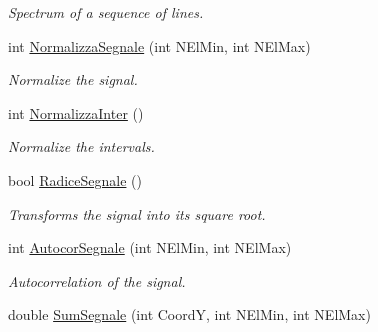 \begin{DoxyCompactItemize}
\begin{DoxyCompactList}\small\item\em \-Spectrum of a sequence of lines. \end{DoxyCompactList}\item 
\hypertarget{classVarDatFile_a0e495e387b74aaa6d55510a945236064}{int \hyperlink{classVarDatFile_a0e495e387b74aaa6d55510a945236064}{\-Normalizza\-Segnale} (int \-N\-El\-Min, int \-N\-El\-Max)}\label{classVarDatFile_a0e495e387b74aaa6d55510a945236064}

\begin{DoxyCompactList}\small\item\em \-Normalize the signal. \end{DoxyCompactList}\item 
\hypertarget{classVarDatFile_a2f01ea77260e98cb7edbb892988fd687}{int \hyperlink{classVarDatFile_a2f01ea77260e98cb7edbb892988fd687}{\-Normalizza\-Inter} ()}\label{classVarDatFile_a2f01ea77260e98cb7edbb892988fd687}

\begin{DoxyCompactList}\small\item\em \-Normalize the intervals. \end{DoxyCompactList}\item 
\hypertarget{classVarDatFile_ab68c66ee2972197a35b5225793337637}{bool \hyperlink{classVarDatFile_ab68c66ee2972197a35b5225793337637}{\-Radice\-Segnale} ()}\label{classVarDatFile_ab68c66ee2972197a35b5225793337637}

\begin{DoxyCompactList}\small\item\em \-Transforms the signal into its square root. \end{DoxyCompactList}\item 
\hypertarget{classVarDatFile_a9aaf71e7c7f27423252d8359f746e4ff}{int \hyperlink{classVarDatFile_a9aaf71e7c7f27423252d8359f746e4ff}{\-Autocor\-Segnale} (int \-N\-El\-Min, int \-N\-El\-Max)}\label{classVarDatFile_a9aaf71e7c7f27423252d8359f746e4ff}

\begin{DoxyCompactList}\small\item\em \-Autocorrelation of the signal. \end{DoxyCompactList}\item 
\hypertarget{classVarDatFile_a6489d2b859470a4e034bc4f795336ae8}{double \hyperlink{classVarDatFile_a6489d2b859470a4e034bc4f795336ae8}{\-Sum\-Segnale} (int \-Coord\-Y, int \-N\-El\-Min, int \-N\-El\-Max)}\label{classVarDatFile_a6489d2b859470a4e034bc4f795336ae8}


\end{DoxyCompactItemize}
